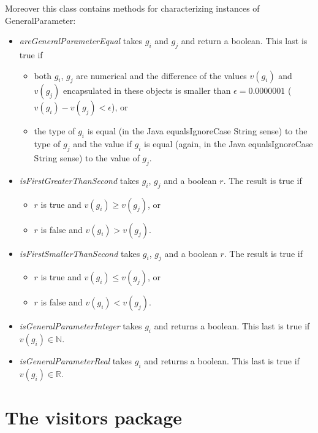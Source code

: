 \documentclass[a4paper,11pt] {ivoa}
\begin{document}
\noindent Moreover this class contains methods for characterizing  instances of GeneralParameter:
\begin{itemize}
\item {\it areGeneralParameterEqual} takes $g_i$ and $g_j$ and return a boolean. This last is true if 
\begin{itemize}
\item both $g_i$, $g_j$ are numerical and the difference of the values $v(g_i)$ and $v(g_j)$ encapsulated in these objects is smaller than $\epsilon = 0.0000001$ ($v(g_i)-v(g_j)<\epsilon$), or 
\item the type of $g_i$  is equal (in the Java equalsIgnoreCase String sense) to the type of $g_j$ and the value if $g_i$ is equal (again, in the Java equalsIgnoreCase String sense) to the value of $g_j$.
\end{itemize} 
\item {\it isFirstGreaterThanSecond} takes $g_i$, $g_j$ and a boolean $r$. The result is true if 
\begin{itemize}
\item $r$ is true and $v(g_i) \geq v(g_j)$, or
\item $r$ is false and $v(g_i) > v(g_j)$.
\end{itemize}
\item {\it isFirstSmallerThanSecond} takes $g_i$, $g_j$ and a boolean $r$. The result is true if 
\begin{itemize}
\item $r$ is true and $v(g_i) \leq v(g_j)$, or
\item $r$ is false and $v(g_i) < v(g_j)$.
\end{itemize}
\item {\it isGeneralParameterInteger} takes $g_i$ and returns a boolean. This last is true if $v(g_i) \in \mathbb N$.
\item {\it isGeneralParameterReal} takes $g_i$ and returns a boolean. This last is true if $v(g_i) \in \mathbb R$.
\end{itemize}
 
 \section{The visitors package}
 
 
\end{document}

